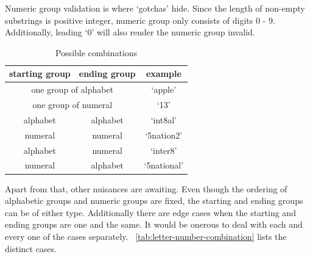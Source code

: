 \documentclass[oneside,11pt]{book}
\theoremstyle{definition}
\theoremstyle{remark}
\begin{document}
Numeric group validation is where `gotchas' hide.
Since the length of non-empty substrings is positive integer,
numeric group only consists of digits $0$ - $9$.
Additionally, leading `$0$' will also render the numeric group invalid.

\begin{table}[h]
    \begin{center}
        \caption{Possible combinations
        \label{tab:letter-number-combination}}
        \begin{tabular}{|c|c|c|}
            \hline
            starting group & ending group & example \\
            \hline
            \multicolumn{2}{|c|}{one group of alphabet} & `apple' \\
            \multicolumn{2}{|c|}{one group of numeral} & `13' \\
            alphabet & alphabet & `int8al' \\
            numeral & numeral & `5nation2' \\
            alphabet & numeral & `inter8' \\
            numeral & alphabet & `5national' \\
            \hline
        \end{tabular}
    \end{center}
\end{table}
Apart from that, other nuisances are awaiting.
Even though the ordering of alphabetic groups and numeric groups are fixed,
the starting and ending groups can be of either type.
Additionally there are edge cases when the starting and ending groups are one and the same.
It would be onerous to deal with each and every one of the cases separately.
~\autoref{tab:letter-number-combination} lists the distinct cases.
\end{document}
